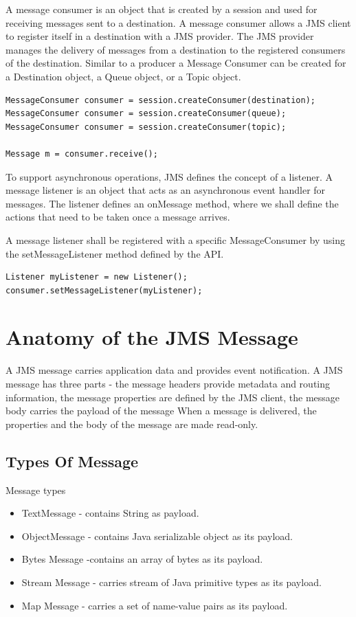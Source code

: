 \documentclass[9pt,twocolumn,twoside]{styles/osajnl}
\begin{document}
A message consumer is an object that is created by a session and used
for receiving messages sent to a destination.  A message consumer
allows a JMS client to register itself in a destination with a JMS
provider. The JMS provider manages the delivery of messages from a
destination to the registered consumers of the destination.  Similar
to a producer a Message Consumer can be created for a Destination
object, a Queue object, or a Topic object.

\begin{lstlisting}
MessageConsumer consumer = session.createConsumer(destination);
MessageConsumer consumer = session.createConsumer(queue);
MessageConsumer consumer = session.createConsumer(topic);

Message m = consumer.receive();
\end{lstlisting}

To support asynchronous operations, JMS defines the concept of a
listener.  A message listener is an object that acts as an
asynchronous event handler for messages. The listener defines an
onMessage method, where we shall define the actions that need to be
taken once a message arrives.

A message listener shall be registered with a specific MessageConsumer
by using the setMessageListener method defined by the API.

\begin{lstlisting}
Listener myListener = new Listener();
consumer.setMessageListener(myListener);
\end{lstlisting}

\section{Anatomy of the JMS Message}


A JMS message carries application data and provides event
notification.  A JMS message has three parts - the message headers
provide metadata and routing information, the message properties are
defined by the JMS client, the message body carries the payload of the
message When a message is delivered, the properties and the body of
the message are made read-only. \cite{www-jms-fischli-article}

\subsection{Types Of Message}

Message types
\begin{itemize}
\item TextMessage - contains String as payload.
\item ObjectMessage - contains Java serializable object as its payload.
\item Bytes Message -contains an array of bytes as its payload.
\item Stream Message - carries stream of Java primitive types as its payload.
\item Map Message - carries a set of name-value pairs as its payload.
\end{itemize}
\end{document}
